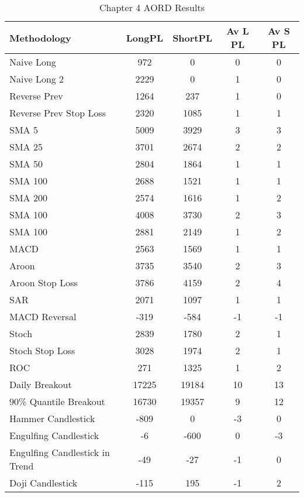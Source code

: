 \begin{table}[ht]
\centering
\caption[Chapter 4 AORD Results]{Chapter 4 AORD Results} 
\label{tab:chp6:aord_summary}
\begin{tabular}{lcccc}
  \toprule Methodology & LongPL & ShortPL & Av L PL & Av S PL \\ 
  \midrule Naive Long & 972 & 0 & 0 & 0 \\ 
  Naive Long 2 & 2229 & 0 & 1 & 0 \\ 
  Reverse Prev & 1264 & 237 & 1 & 0 \\ 
  Reverse Prev Stop Loss & 2320 & 1085 & 1 & 1 \\ 
  SMA 5 & 5009 & 3929 & 3 & 3 \\ 
  SMA 25 & 3701 & 2674 & 2 & 2 \\ 
  SMA 50 & 2804 & 1864 & 1 & 1 \\ 
  SMA 100 & 2688 & 1521 & 1 & 1 \\ 
  SMA 200 & 2574 & 1616 & 1 & 2 \\ 
  SMA 100 & 4008 & 3730 & 2 & 3 \\ 
  SMA 100 & 2881 & 2149 & 1 & 2 \\ 
  MACD & 2563 & 1569 & 1 & 1 \\ 
  Aroon & 3735 & 3540 & 2 & 3 \\ 
  Aroon Stop Loss & 3786 & 4159 & 2 & 4 \\ 
  SAR & 2071 & 1097 & 1 & 1 \\ 
  MACD Reversal & -319 & -584 & -1 & -1 \\ 
  Stoch & 2839 & 1780 & 2 & 1 \\ 
  Stoch Stop Loss & 3028 & 1974 & 2 & 1 \\ 
  ROC & 271 & 1325 & 1 & 2 \\ 
  Daily Breakout & 17225 & 19184 & 10 & 13 \\ 
  90\% Quantile Breakout & 16730 & 19357 & 9 & 12 \\ 
  Hammer Candlestick & -809 & 0 & -3 & 0 \\ 
  Engulfing Candlestick & -6 & -600 & 0 & -3 \\ 
  Engulfing Candlestick in Trend & -49 & -27 & -1 & 0 \\ 
  Doji Candlestick & -115 & 195 & -1 & 2 \\ 
   \bottomrule \end{tabular}
\end{table}
